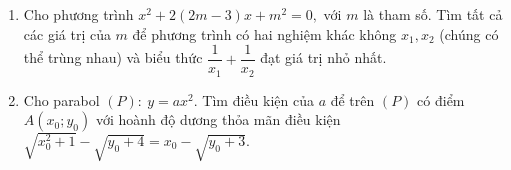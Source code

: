 \begin{ex}%
	\begin{enumerate}
		\item Cho phương trình $x^2+2(2m-3)x+m^2=0,$ với $m$ là tham số. Tìm tất cả các giá trị của $m$ để phương trình có hai nghiệm khác không $ x_1,x_2$ (chúng có thể trùng nhau) và biểu thức $\dfrac{1}{x_1}+\dfrac{1}{x_2}$ đạt giá trị nhỏ nhất.
		\item Cho parabol $(P):\ y=ax^2.$ Tìm điều kiện của $a$ để trên $(P)$ có điểm $A(x_0;y_0)$ với hoành độ dương thỏa mãn điều kiện $\sqrt{x^2_0+1}-\sqrt{y_0+4}=x_0- \sqrt{y_0+3}.$
	\end{enumerate}

\end{ex}
